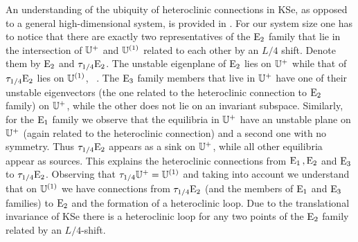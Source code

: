An understanding of the ubiquity of heteroclinic connections in KSe, as
opposed to a general high-dimensional system, is provided in .
For our system size one has to notice that there are exactly two representatives
of the $\mathrm{E}_{2}$ family that lie in the intersection of $\mathbb{U}^+$ and $\mathbb{U}^{(1)}$ related
to each other by an $L/4$ shift. Denote them by $\mathrm{E}_{2}$ and $\tau_{1/4}\mathrm{E}_{2}$. The unstable eigenplane of
$\mathrm{E}_{2}$ lies on $\mathbb{U}^+$ while that of $\tau_{1/4}\mathrm{E}_{2}$ lies on $\mathbb{U}^{(1)}$, \cf\ . 
The $\mathrm{E}_{3}$ family members that live in $\mathbb{U}^+$ have one of their unstable eigenvectors (the one related to the heteroclinic
connection to $\mathrm{E}_{2}$ family)  on $\mathbb{U}^+$, while the other does not lie on an invariant subspace.
Similarly, for the $\mathrm{E}_{1}$ family we observe that the equilibria in $\mathbb{U}^+$ have
an unstable plane on $\mathbb{U}^+$ (again related to the heteroclinic connection) and a second one with no symmetry. 
Thus $\tau_{1/4}\mathrm{E}_{2}$ appears as a sink on $\mathbb{U}^+$, while all other equilibria appear as sources.
This explains the heteroclinic connections from $\mathrm{E}_{1}\,,\mathrm{E}_{2}$ and $\mathrm{E}_{3}$ to $\tau_{1/4}\mathrm{E}_{2}$.
Observing that $\tau_{1/4} \mathbb{U}^+= \mathbb{U}^{(1)}$ and taking into account  we understand that on $\mathbb{U}^{(1)}$
we have connections from $\tau_{1/4}\mathrm{E}_{2}$ (and the members of $\mathrm{E}_{1}$ and $\mathrm{E}_{3}$ families) to $\mathrm{E}_{2}$ and the
formation of a heteroclinic loop. Due to the translational invariance of KSe there is a heteroclinic loop for any two points
of the $\mathrm{E}_{2}$ family related by an $L/4$-shift.

